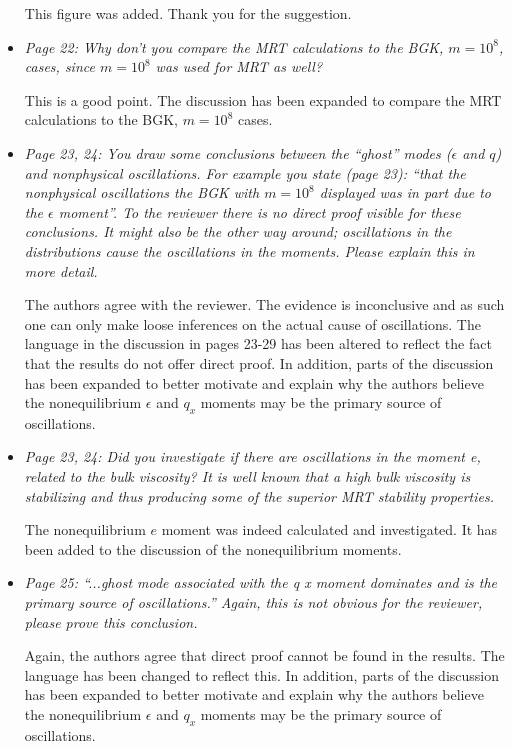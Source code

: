 \documentclass{article}
\begin{document}
\begin{itemize}
	This figure was added.
	Thank you for the suggestion.
	
	\item \emph{Page 22: Why don’t you compare the MRT calculations to the BGK,
		$m=10^8$, cases, since $m=10^8$ was used for MRT as well?}
	
	This is a good point.
	The discussion has been expanded to compare the MRT calculations to the BGK, $m = 10^8$ cases.
	
	\item \emph{Page 23, 24: You draw some conclusions between the ``ghost'' modes ($\epsilon$ and $q$) and
		nonphysical oscillations. For example you state (page 23): ``that the nonphysical
		oscillations the BGK with $m = 10^8$ displayed was in part due to the $\epsilon$ moment''.
		To the reviewer there is no direct proof visible for these conclusions. It might also be
		the other way around; oscillations in the distributions cause the oscillations in the
		moments. Please explain this in more detail.}
		
	The authors agree with the reviewer.
	The evidence is inconclusive and as such one can only make loose inferences on the actual cause of oscillations.
	The language in the discussion in pages 23-29 has been altered to reflect the fact that the results do not offer direct proof.
	In addition, parts of the discussion has been expanded to better motivate and explain why the authors believe the nonequilibrium $\epsilon$ and $q_x$ moments may be the primary source of oscillations.
	
	\item \emph{Page 23, 24: Did you investigate if there are oscillations in the moment e, related to
		the bulk viscosity? It is well known that a high bulk viscosity is stabilizing and thus
		producing some of the superior MRT stability properties.}
	
	The nonequilibrium $e$ moment was indeed calculated and investigated.
	It has been added to the discussion of the nonequilibrium moments.
	
	\item \emph{Page 25: ``...ghost mode associated with the q x moment dominates and is the
		primary source of oscillations.'' Again, this is not obvious for the reviewer, please
		prove this conclusion.}
	
	Again, the authors agree that direct proof cannot be found in the results.
	The language has been changed to reflect this.
	In addition, parts of the discussion has been expanded to better motivate and explain why the authors believe the nonequilibrium $\epsilon$ and $q_x$ moments may be the primary source of oscillations.
	

\end{itemize}
\end{document}
